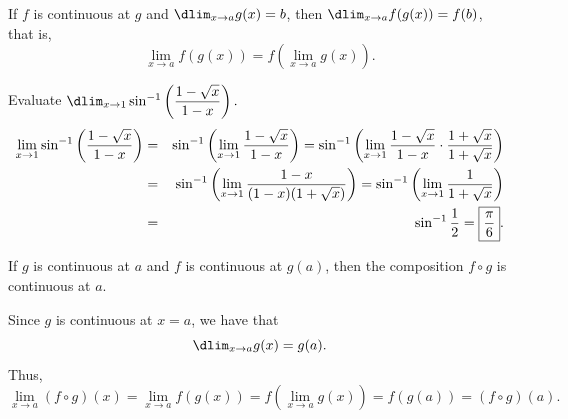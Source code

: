 \documentclass{book}
\begin{document}
\begin{Thm} If $f$ is continuous at $g$ and $\dlim_{x\to a} g(x) = b$, then $\dlim_{x\to a} f(g(x)) = f(b)$, that is, \[\lim_{x\to a} f(g(x)) = f\left(\lim_{x\to a} g(x)\right).\]
\end{Thm}\vs

\begin{Exam} Evaluate $\dlim_{x\to 1} \sin^{-1}\left(\dfrac{1-\sqrt{x}}{1-x}\right).$
\begin{eqnarray*}
\lim_{x\to 1} \sin^{-1}\left(\dfrac{1-\sqrt{x}}{1-x}\right) &=& \sin^{-1}\left( \lim_{x\to 1}\dfrac{1-\sqrt{x}}{1-x}\right) = \sin^{-1}\left( \lim_{x\to 1}\dfrac{1-\sqrt{x}}{1-x}\cdot\dfrac{1+\sqrt x}{1+\sqrt x}\right)\\
&=&  \sin^{-1}\left(\lim_{x\to 1}\dfrac{1-x}{(1-x)(1+\sqrt{x})}\right) = \sin^{-1}\left(\lim_{x\to 1}\dfrac{1}{1+\sqrt{x}}\right)\\
&=& \sin^{-1} \dfrac{1}{2}= \fbox{$\dfrac{\pi}{6}$}.
\end{eqnarray*}
\end{Exam}\vs

\begin{Thm} If $g$ is continuous at $a$ and $f$ is continuous at $g(a)$, then the composition $f\circ g$ is continuous at $a$.\end{Thm}
\begin{pf}
Since $g$ is continuous at $x=a$, we have that \[\dlim_{x\to a} g(x) = g(a).\] Thus, \[\lim_{x\to a} (f\circ g)(x) = \lim_{x\to a} f(g(x)) = f\left(\lim_{x\to a} g(x)\right) = f(g(a)) = (f\circ g)(a). \]
\end{pf}\vs
\end{document}
